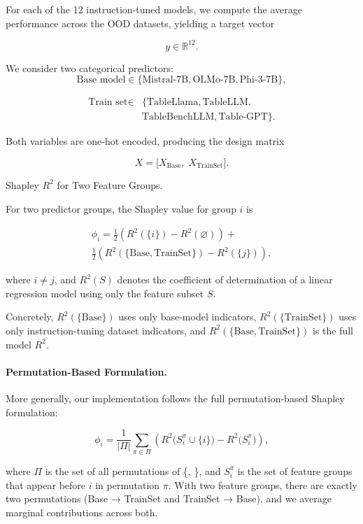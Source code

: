 \documentclass[11pt]{article}
\begin{document}
For each of the 12 instruction-tuned models, we compute the average performance across the OOD datasets, yielding a target vector

\[
y \in \mathbb{R}^{12}.
\]

We consider two categorical predictors:
\[
\text{Base model} \in \{\text{Mistral-7B}, \text{OLMo-7B}, \text{Phi-3-7B}\},
\]

\[
\begin{aligned}
    \text{Train set} \in & \{\text{TableLlama}, \text{TableLLM}, \\
    & \text{TableBenchLLM}, \text{Table-GPT}\}.
\end{aligned}
\]

Both variables are one-hot encoded, producing the design matrix

\[
X = \big[ X_{\text{Base}},\; X_{\text{TrainSet}} \big].
\]

Shapley $R^{2}$ for Two Feature Groups.

For two predictor groups, the Shapley value for group $i$ is

\[
\begin{aligned}
    \phi_i = \frac{1}{2}\!\left( R^2(\{i\}) - R^2(\varnothing) \right)
+ \\\frac{1}{2}\!\left(R^2(\{\text{Base}, \text{TrainSet}\}) - R^2(\{j\}) \right),
\end{aligned}
\]

where $i \neq j$, and $R^2(S)$ denotes the coefficient of determination of a linear regression model using only the feature subset $S$.

Concretely, $R^2(\{\text{Base}\})$ uses only base-model indicators, $R^2(\{\text{TrainSet}\})$ uses only instruction-tuning dataset indicators, and $R^2(\{\text{Base},\text{TrainSet}\})$ is the full model $R^2$.

\paragraph{Permutation-Based Formulation.}

More generally, our implementation follows the full permutation-based Shapley formulation:

\[
\phi_i
= \frac{1}{|\Pi|}
\sum_{\pi \in \Pi}
\left(
R^{2}\big( S_i^\pi \cup \{i\} \big)
- R^{2}\big( S_i^\pi \big)
\right),
\]

where $\Pi$ is the set of all permutations of \{, \}, and $S_i^\pi$ is the set of feature groups that appear before $i$ in permutation $\pi$.
With two feature groups, there are exactly two permutations (Base → TrainSet and TrainSet → Base), and we average marginal contributions across both.
\end{document}
